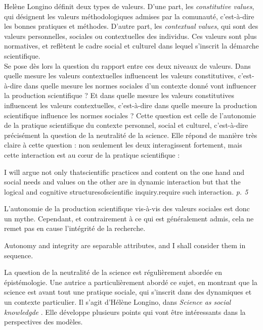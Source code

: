 Helène Longino définit deux types de valeurs. D'une part, les \emph{constitutive values}, qui désignent les valeurs méthodologiques admises par la comunauté, c'est-à-dire les bonnes pratiques et méthodes. D'autre part, les \emph{contextual values}, qui sont des valeurs personnelles, sociales ou contextuelles des individus. Ces valeurs sont plus normatives, et reflètent le cadre social et culturel dans lequel s'inscrit la démarche scientifique. \\

Se pose dès lors la question du rapport entre ces deux niveaux de valeurs. Dans quelle mesure les valeurs contextuelles influencent les valeurs constitutives, c'est-à-dire dans quelle mesure les normes sociales d'un contexte donné vont influencer la production scientifique ? Et dans quelle mesure les valeurs constitutives influencent les valeurs contextuelles, c'est-à-dire dans quelle mesure la production scientifique influence les normes sociales ? Cette question est celle de l'autonomie de la pratique scientifique du contexte personnel, social et culturel, c'est-à-dire précisément la question de la neutralité de la science. Elle répond de manière très claire à cette question : non seulement les deux interagissent fortement, mais cette interaction est au cœur de la pratique scientifique : 

\begin{displayquote}
    I will argue not only thatscientific practices and content on the one hand and social needs and values on the other are in dynamic interaction but that the logical and cognitive structuresofscientific inquiry.require such interaction. \textit{p. 5}
\end{displayquote}

L'autonomie de la production scientifique vis-à-vis des valeurs sociales est donc un mythe. Cependant, et contrairement à ce qui est généralement admis, cela ne remet pas en cause l'intégrité de la recherche. 

\begin{displayquote}
    Autonomy and integrity are separable attributes, and I shall consider them in sequence.
\end{displayquote}

La question de la neutralité de la science est régulièrement abordée en épistémologie. Une autrice a particulièrement abordé ce sujet, en montrant que la science est avant tout une pratique sociale, qui s'inscrit dans des dynamiques et un contexte particulier. Il s'agit d'Hélène Longino, dans \emph{Science as social knowledgde} \cite{longino_science_1990}. Elle développe plusieurs points qui vont être intéressants dans la perspectives des modèles. \\

